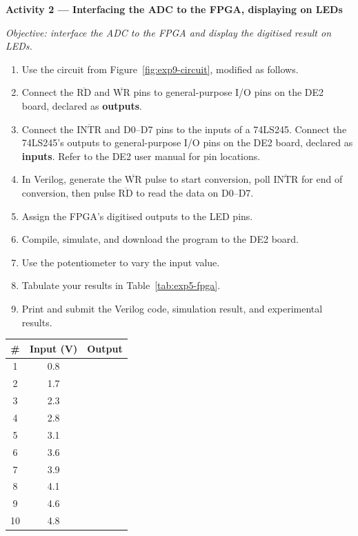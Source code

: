 \begin{procedure}
  \textbf{Activity 2 --- Interfacing the ADC to the FPGA, displaying on LEDs}\vspace{2pt}

  \textit{Objective: interface the ADC to the FPGA and display the digitised result on LEDs.}

  \begin{enumerate}
    \item Use the circuit from Figure~\ref{fig:exp9-circuit}, modified as follows.
    \item Connect the $\overline{\text{RD}}$ and $\overline{\text{WR}}$ pins to general-purpose I/O pins on the DE2 board, declared as \textbf{outputs}.
    \item Connect the $\overline{\text{INTR}}$ and D0--D7 pins to the inputs of a 74LS245. Connect the 74LS245's outputs to general-purpose I/O pins on the DE2 board, declared as \textbf{inputs}. Refer to the DE2 user manual for pin locations.
    \item In Verilog, generate the $\overline{\text{WR}}$ pulse to start conversion, poll $\overline{\text{INTR}}$ for end of conversion, then pulse $\overline{\text{RD}}$ to read the data on D0--D7.
    \item Assign the FPGA's digitised outputs to the LED pins.
    \item Compile, simulate, and download the program to the DE2 board.
    \item Use the potentiometer to vary the input value.
    \item Tabulate your results in Table~\ref{tab:exp5-fpga}.
    \item Print and submit the Verilog code, simulation result, and experimental results.
  \end{enumerate}

  \needspace{4cm}
  \begin{boxedtable}
    \label{tab:exp5-fpga}
    {\renewcommand{\arraystretch}{1.5}
      \centering
      \begin{tabular}{cc c}
        \toprule
        \# & Input (V) & Output \\
        \midrule
        1  & 0.8       &        \\
        2  & 1.7       &        \\
        3  & 2.3       &        \\
        4  & 2.8       &        \\
        5  & 3.1       &        \\
        6  & 3.6       &        \\
        7  & 3.9       &        \\
        8  & 4.1       &        \\
        9  & 4.6       &        \\
        10 & 4.8       &        \\
        \bottomrule
      \end{tabular}
    }
  \end{boxedtable}
  \vspace*{1.5em}


\end{procedure}
